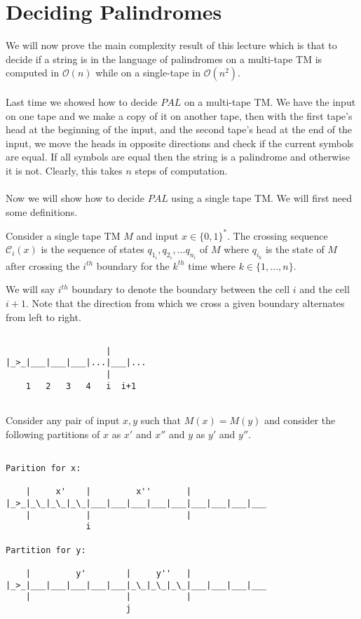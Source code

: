 \documentclass[usletter]{article}
\begin{document}
\section{Deciding Palindromes}
We will now prove the main complexity result of this lecture which is that to decide if a string is in the language of palindromes on a multi-tape TM is computed in $\mathcal{O}(n)$ while on a single-tape in $\mathcal{O}(n^2)$. 
\\\\
Last time we showed how to decide $PAL$ on a multi-tape TM. We have the input on one tape and we make a copy of it on another tape, then with the first tape's head at the beginning of the input, and the second tape's head at the end of the input, we move the heads in opposite directions and check if the current symbols are equal. If all symbols are equal then the string is a palindrome and otherwise it is not. Clearly, this takes $n$ steps of computation.
\\\\
Now we will show how to decide $PAL$ using a single tape TM. We will first need some definitions.

\begin{definition}
Consider a single tape TM $M$ and input $x \in \{0,1\}^*$. The crossing sequence $\mathcal{C}_i(x)$ is the sequence of states $q_{1_i}, q_{2_i}, ...q_{n_i}$ of $M$ where $q_{i_k}$ is the state of $M$ after crossing the $i^{th}$ boundary for the $k^{th}$ time where $k \in \{1,...,n\}$.
\end{definition}
\noindent
We will say $i^{th}$ boundary to denote the boundary between the cell $i$ and the cell $i+1$. Note that the direction from which we cross a given boundary alternates from left to right.
\begin{verbatim}

                    |
|_>_|___|___|___|...|___|...
                    |      
    1   2   3   4   i  i+1
                  
\end{verbatim}
\noindent
Consider any pair of input $x, y$ such that $M(x) = M(y)$ and consider the following partitions of $x$ as $x'$ and   $x''$ and $y$ as $y'$ and $y''$.

\begin{verbatim}

Parition for x:

    |     x'    |         x''       |    
|_>_|_\_|_\_|_\_|___|___|___|___|___|___|___|___|___
    |           |                   |    
                i

Partition for y:
                
    |         y'        |     y''   |
|_>_|___|___|___|___|___|_\_|_\_|_\_|___|___|___|___
    |                   |           |
                        j          
                
\end{verbatim} 
\end{document}
